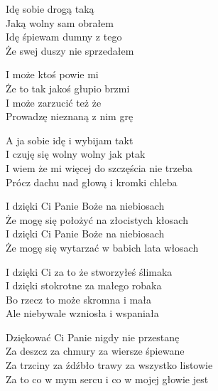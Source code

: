 \begin{text}
    \hfill\break
    Idę sobie drogą taką\\
    Jaką wolny sam obrałem\\
    Idę śpiewam dumny z tego\\
    Że swej duszy nie sprzedałem

    I może ktoś powie mi\\
    Że to tak jakoś głupio brzmi\\
    I może zarzucić też że\\
    Prowadzę nieznaną z nim grę

    A ja sobie idę i wybijam takt\\
    I czuję się wolny wolny jak ptak\\
    I wiem że mi więcej do szczęścia nie trzeba\\
    Prócz dachu nad głową i kromki chleba

    I dzięki Ci Panie Boże na niebiosach\\
    Że mogę się położyć na złocistych kłosach\\
    I dzięki Ci Panie Boże na niebiosach\\
    Że mogę się wytarzać w babich lata włosach

    I dzięki Ci za to że stworzyłeś ślimaka\\
    I dzięki stokrotne za małego robaka\\
    Bo rzecz to może skromna i mała\\
    Ale niebywale wzniosła i wspaniała

    Dziękować Ci Panie nigdy nie przestanę\\
    Za deszcz za chmury za wiersze śpiewane\\
    Za trzciny za źdźbło trawy za wszystko listowie\\
    Za to co w mym sercu i co w mojej głowie jest
\end{text}
